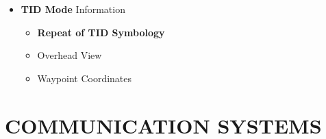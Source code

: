 \documentclass[fontInter]{TechCheck}
\begin{document}
\begin{longtableitemize}
{\begin{tableminipage}
\begin{itemize}
\begin{itemize}
					\item \textbf{TAS} -- \textbf{T}rue \textbf{A}ir\textbf{S}peed (kts)
					\item \textbf{GS} -- \textbf{G}round\textbf{S}peed (kts)
				\end{itemize}
				\item \textbf{TID Mode} Information
				\begin{itemize}
					\item \textbf{Repeat of TID Symbology}
					\item Overhead View
					\item Waypoint Coordinates
				\end{itemize}
			\end{itemize}
		\end{tableminipage}}
	\end{longtableitemize}

	\cleardoublepage

	\section{COMMUNICATION SYSTEMS}
\end{document}
